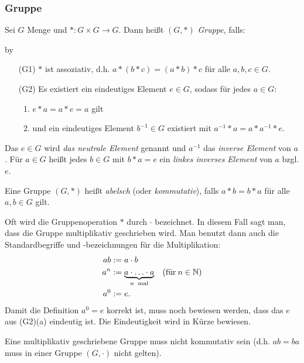 \subsubsection{Gruppe}

Sei $ G $ Menge und $ \ast : G \times G \to G $. Dann heißt $ (G,\ast) $ \emph{Gruppe}, falls:

\advance\myindent by \the{}

\begin{itemize}[leftmargin=\myindent]
	\item[(G1)] $ \ast $ ist assoziativ, d.h. $ a \ast ( b \ast c ) = ( a \ast b ) \ast c $ für alle $ a,b,c \in G $.
	\item[(G2)] Es existiert ein eindeutiges Element $ e \in G $, sodass für jedes $ a \in G $:
	\begin{enumerate}[label={(\alph*)}]
		\item $ e \ast a = a \ast e = a $ gilt
		\item und ein eindeutiges Element $ b^{-1} \in G $ existiert mit $ a^{-1} \ast a = a \ast a^{-1} \ast e $.
	\end{enumerate}
\end{itemize}
Das $ e \in G $ wird \emph{das neutrale Element} genannt und $a^{-1}$ das \emph{inverse Element} von $a$. Für $ a \in G $ heißt jedes $ b \in G $ mit $ b \ast a = e $ ein \emph{linkes inverses Element} von $ a $ bzgl. $ e $.

Eine Gruppe $ (G,\ast) $ heißt \emph{abelsch} (oder \emph{kommutativ}), falls $ a \ast b = b \ast a $ für alle $ a,b \in G $ gilt.

\begin{bem}
	Oft wird die Gruppenoperation $ \ast $ durch $ \cdot $ bezeichnet. In diesem Fall sagt man, dass die Gruppe multiplikativ geschrieben wird. Man benutzt dann auch die Standardbegriffe und -bezeichnungen für die Multiplikation:
	\begin{align}
		ab &:= a \cdot b \\
		a^n &:= \underbrace{a \cdot \ldots \cdot a}_{n \text{\: mal}} \quad (\text{für}\: n \in \mathbb N) \\
		a^0 &:= e.
	\end{align}
	Damit die Definition $a^0 = e $ korrekt ist, muss noch bewiesen werden, dass das $e$ aus (G2)(a) eindeutig ist. Die Eindeutigkeit wird in Kürze bewiesen. 
	
	Eine multiplikativ geschriebene Gruppe muss nicht kommutativ sein (d.h. $ ab = ba $ muss in einer Gruppe $(G, \cdot)$ nicht gelten).
\end{bem}

